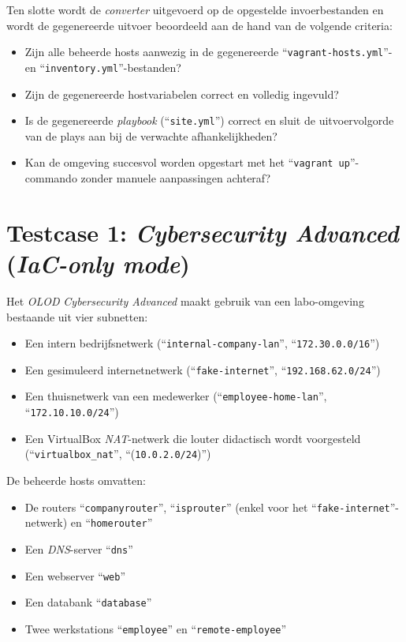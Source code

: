 Ten slotte wordt de \emph{converter} uitgevoerd op de opgestelde invoerbestanden en wordt de gegenereerde uitvoer beoordeeld aan de hand van de volgende criteria:
\begin{itemize}
    \item Zijn alle beheerde hosts aanwezig in de gegenereerde ``\texttt{vagrant-hosts.yml}''- en ``\texttt{inventory.yml}''-bestanden?
    \item Zijn de gegenereerde hostvariabelen correct en volledig ingevuld?
    \item Is de gegenereerde \emph{playbook} (``\texttt{site.yml}'') correct en sluit de uitvoervolgorde van de plays aan bij de verwachte afhankelijkheden?
    \item Kan de omgeving succesvol worden opgestart met het ``\texttt{vagrant up}''-commando zonder manuele aanpassingen achteraf?
\end{itemize}

\section{Testcase 1: \emph{Cybersecurity Advanced} (\emph{IaC-only mode})}%
\label{sec:testcase1}

Het \emph{OLOD} \emph{Cybersecurity Advanced} maakt gebruik van een labo-omgeving bestaande uit vier subnetten:

\begin{itemize}
    \item Een intern bedrijfsnetwerk (``\texttt{internal-company-lan}'', ``\texttt{172.30.0.0/16}'')
    \item Een gesimuleerd internetnetwerk (``\texttt{fake-internet}'', ``\texttt{192.168.62.0/24}'')
    \item Een thuisnetwerk van een medewerker (``\texttt{employee-home-lan}'', \\``\texttt{172.10.10.0/24}'')
    \item Een VirtualBox \emph{NAT}-netwerk die louter didactisch wordt voorgesteld (``\texttt{virtualbox\_nat}'', ``(\texttt{10.0.2.0/24})'')
\end{itemize}

De beheerde hosts omvatten:

\begin{itemize}
    \item De routers ``\texttt{companyrouter}'', ``\texttt{isprouter}'' (enkel voor het ``\texttt{fake-internet}''-netwerk) en ``\texttt{homerouter}''
    \item Een \emph{DNS}-server ``\texttt{dns}''
    \item Een webserver ``\texttt{web}''
    \item Een databank ``\texttt{database}''
    \item Twee werkstations ``\texttt{employee}'' en ``\texttt{remote-employee}''
\end{itemize}

